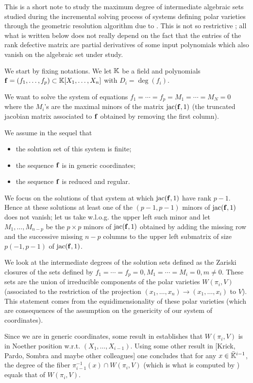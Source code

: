 \documentclass[12pt]{article}
\begin{document}
This is a short note to study the maximum degree of intermediate
algebraic sets studied during the incremental solving process of
systems defining polar varieties through the geometric resolution
algorithm due to \cite{GiLeSa01}. This is not so restrictive ; all
what is written below does not really depend on the fact that the
entries of the rank defective matrix are partial derivatives of some
input polynomials which also vanish on the algebraic set under study.

We start by fixing notations. We let $\mathbb{K}$ be a field and polynomials
$\mathbf{f}=(f_1, \ldots, f_p)\subset \mathbb{K}[X_1, \ldots, X_n]$ with $D_i=\deg(f_i)$.

We want to solve the system of equations
$f_1=\cdots=f_p=M_1=\cdots=M_N=0$ where the $M_i$'s are the maximal
minors of the matrix ${\rm jac}(\mathbf{f}, 1)$ (the truncated jacobian matrix
associated to $\mathbf{f}$ obtained by removing the first column).

We assume in the sequel that
\begin{itemize}
\item the solution set of this system is
finite; 
\item the sequence $\mathbf{f}$ is in generic coordinates; 
\item the sequence $\mathbf{f}$ is reduced and regular.
\end{itemize}


We focus on the solutions of that system at which ${\rm jac}(\mathbf{f}, 1)$ have
rank $p-1$. Hence at these solutions at least one of the $(p-1, p-1)$
minors of ${\rm jac}(\mathbf{f}, 1)$ does not vanish; let us take w.l.o.g. the
upper left such minor and let $M_1, \ldots, M_{n-p}$ be the
$p\times p$ minors of ${\rm jac}(\mathbf{f}, 1)$ obtained by adding the missing row
and the successive missing $n-p$ columns to the upper left submatrix
of size $p(-1,p-1)$ of ${\rm jac}(\mathbf{f}, 1)$.

We look at the intermediate degrees of the solution sets defined as
the Zariski closures of the sets defined by
$f_1=\cdots=f_p=0, M_1=\cdots=M_i=0, m\neq 0$.  These sets are the
union of irreducible components of the polar varieties $W(\pi_i, V)$
(associated to the restriction of the projection
$(x_1, \ldots, x_n)\to (x_1, \ldots, x_i)$ to $V$). This statement
comes from the equidimensionality of these polar varieties (which are
consequences of the assumption on the genericity of our system of
coordinates).

Since we are in generic coordinates, some result in \cite{SaSc03}
establishes that $W(\pi_i, V)$ is in Noether position w.r.t.
$(X_1, \ldots, X_{i-1})$. Using some other result in [Krick, Pardo,
Sombra and maybe other colleagues] one concludes that for any
$x\in \bar{\mathbb{K}}^{i-1}$, the degree of the fiber
$\pi_{i-1}^{-1}(x)\cap W(\pi_i, V)$ (which is what is computed by
\cite{GiLeSa01}) equals that of $W(\pi_i, V)$.
\end{document}
